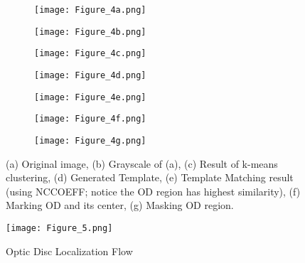 \documentclass{svproc}
\begin{document}
\vspace{-2mm}
\begin{figure}
     \centering
     \begin{subfigure}[b]{0.24\textwidth}
         \centering
         \texttt{[image: Figure\_4a.png]}
         \caption{}
         \label{fig: fig4a}
     \end{subfigure}
     \hfill
     \begin{subfigure}[b]{0.24\textwidth}
         \centering
         \texttt{[image: Figure\_4b.png]}
         \caption{}
         \label{fig: fig4b}
     \end{subfigure}
     \hfill
     \begin{subfigure}[b]{0.24\textwidth}
         \centering
         \texttt{[image: Figure\_4c.png]}
         \caption{}
         \label{fig: fig4c}
     \end{subfigure}
     \hfill
     \begin{subfigure}[b]{0.178\textwidth}
         \centering
         \texttt{[image: Figure\_4d.png]}
         \caption{}
         \label{fig: fig4d}
     \end{subfigure}
     \begin{subfigure}[b]{0.2702\textwidth}
         \centering
         \texttt{[image: Figure\_4e.png]}
         \caption{}
         \label{fig: fig4e}
     \end{subfigure}
     \begin{subfigure}[b]{0.24\textwidth}
         \centering
         \texttt{[image: Figure\_4f.png]}
         \caption{}
         \label{fig: fig4f}
     \end{subfigure}
     \begin{subfigure}[b]{0.24\textwidth}
         \centering
         \texttt{[image: Figure\_4g.png]}
         \caption{}
         \label{fig: fig4g}
     \end{subfigure}
        \caption{(a) Original image, (b) Grayscale of (a), (c) Result of k-means clustering, (d) Generated Template, (e) Template Matching result (using NCCOEFF; notice the OD region has highest similarity), (f) Marking OD and its center, (g) Masking OD region.}
        \label{fig: fig4}
\end{figure}


\begin{figure}
    \centering
    \texttt{[image: Figure\_5.png]}
    \caption{Optic Disc Localization Flow}
    \label{fig: fig5}
\end{figure}
\end{document}
